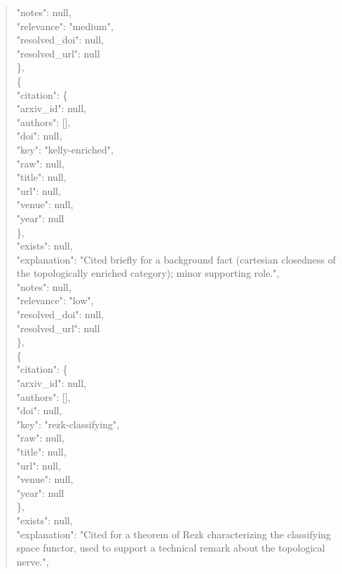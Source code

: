 \documentclass[11pt]{article}
\begin{document}
\begin{quote}
      "notes": null,\\
      "relevance": "medium",\\
      "resolved\_doi": null,\\
      "resolved\_url": null\\
    \},\\
    \{\\
      "citation": \{\\
        "arxiv\_id": null,\\
        "authors": [],\\
        "doi": null,\\
        "key": "kelly-enriched",\\
        "raw": null,\\
        "title": null,\\
        "url": null,\\
        "venue": null,\\
        "year": null\\
      \},\\
      "exists": null,\\
      "explanation": "Cited briefly for a background fact (cartesian closedness of the topologically enriched category); minor supporting role.",\\
      "notes": null,\\
      "relevance": "low",\\
      "resolved\_doi": null,\\
      "resolved\_url": null\\
    \},\\
    \{\\
      "citation": \{\\
        "arxiv\_id": null,\\
        "authors": [],\\
        "doi": null,\\
        "key": "rezk-classifying",\\
        "raw": null,\\
        "title": null,\\
        "url": null,\\
        "venue": null,\\
        "year": null\\
      \},\\
      "exists": null,\\
      "explanation": "Cited for a theorem of Rezk characterizing the classifying space functor, used to support a technical remark about the topological nerve.",\\

\end{quote}
\end{document}
